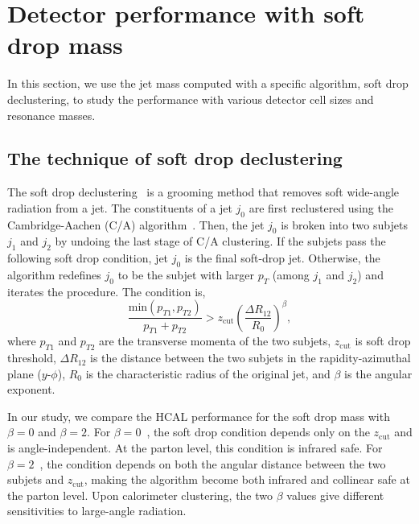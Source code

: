 \section{Detector performance with soft drop mass}

In this section, we use the jet mass computed with a specific algorithm, soft 
drop declustering, to study the performance with various detector 
cell sizes and resonance masses. 

\subsection{The technique of soft drop declustering}
The soft drop declustering~\cite{Larkoski:2014wba} is a grooming method 
that removes soft wide-angle radiation from a jet. The constituents of a jet 
$j_0$ are first reclustered using the Cambridge-Aachen
 (C/A) algorithm~\cite{Dokshitzer:1997in,Wobisch:1998wt}. Then, the jet $j_0$ 
is broken into two subjets $j_1$ and $j_2$ by undoing the last stage of C/A 
clustering.
If the subjets pass the following soft drop condition, jet $j_0$ is the final 
soft-drop jet. Otherwise, the algorithm redefines $j_0$ to be the subjet with 
larger $p_T$ (among $j_1$ and $j_2$) and iterates the procedure. The condition is, 
\begin{equation} \label{eq:soft-drop}
\frac{\mathrm{min}(p_{T1},p_{T2})}{p_{T1}+p_{T2}}>z_\mathrm{cut}(\frac{\Delta R_{12}}{R_{0}})^{\beta},
\end{equation}
where $p_{T1}$ and $p_{T2}$ are the transverse momenta of the two subjets, 
$z_\mathrm{cut}$ is soft drop threshold, 
$\Delta R_{12}$ is the distance between the two subjets in the 
rapidity-azimuthal plane ($y$-$\phi$), $R_0$ is the characteristic radius 
of the original jet, and $\beta$ is the angular exponent.

In our study, we compare the HCAL performance for  the soft drop mass with 
$\beta=0$  and $\beta=2$. For $\beta=0$~\cite{CMS:2017wyc,Tripathee:2017ybi}, the soft drop condition 
depends only on the $z_\mathrm{cut}$ and is angle-independent. At the parton level, this condition is infrared safe. For $\beta=2$~\cite{Aaboud:2017qwh}, the condition depends on both 
the angular distance between the two subjets and $z_\mathrm{cut}$, making the 
algorithm become both infrared and collinear safe at the parton level. Upon calorimeter clustering, the two $\beta$ values give  different sensitivities to large-angle radiation.

